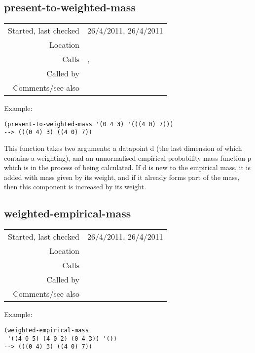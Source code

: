 \subsection*{present-to-weighted-mass}\label{fun:present-to-weighted-mass}

\vspace{0.3cm}
\begin{tabular}{r|p{8cm}}
Started, last checked & 26/4/2011, 26/4/2011 \\
Location & \nameref{sec:keyscape} \\
Calls & \nameref{fun:accumulate-to-weighted-mass},\newline \nameref{fun:add-to-weighted-mass} \\
Called by & \nameref{fun:weighted-empirical-mass} \\
Comments/see also & 
\end{tabular}

\vspace{0.5cm}
\noindent Example:
\begin{verbatim}
(present-to-weighted-mass '(0 4 3) '(((4 0) 7)))
--> (((0 4) 3) ((4 0) 7))
\end{verbatim}

\noindent This function takes two arguments: a
datapoint d (the last dimension of which contains a
weighting), and an unnormalised empirical probability
mass function p which is in the process of being
calculated. If d is new to the empirical mass, it is
added with mass given by its weight, and if it already
forms part of the mass, then this component is
increased by its weight.


\subsection*{weighted-empirical-mass}\label{fun:weighted-empirical-mass}

\vspace{0.3cm}
\begin{tabular}{r|p{8cm}}
Started, last checked & 26/4/2011, 26/4/2011 \\
Location & \nameref{sec:keyscape} \\
Calls & \nameref{fun:present-to-weighted-mass} \\
Called by & \nameref{fun:key-correlations} \\
Comments/see also & 
\end{tabular}

\vspace{0.5cm}
\noindent Example:
\begin{verbatim}
(weighted-empirical-mass
 '((4 0 5) (4 0 2) (0 4 3)) '())
--> (((0 4) 3) ((4 0) 7))
\end{verbatim}

